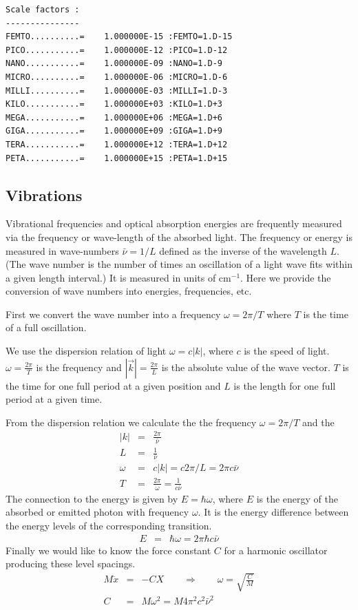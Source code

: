 \documentclass[final,12pt,makeidx,DIV=calc]{article}
\begin{document}
{{{\begin{verbatim}
Scale factors :
---------------
FEMTO..........=    1.000000E-15 :FEMTO=1.D-15
PICO...........=    1.000000E-12 :PICO=1.D-12
NANO...........=    1.000000E-09 :NANO=1.D-9
MICRO..........=    1.000000E-06 :MICRO=1.D-6
MILLI..........=    1.000000E-03 :MILLI=1.D-3
KILO...........=    1.000000E+03 :KILO=1.D+3
MEGA...........=    1.000000E+06 :MEGA=1.D+6
GIGA...........=    1.000000E+09 :GIGA=1.D+9
TERA...........=    1.000000E+12 :TERA=1.D+12
PETA...........=    1.000000E+15 :PETA=1.D+15
\end{verbatim}

\newpage
\subsection{Vibrations}

Vibrational frequencies and optical absorption energies are frequently
measured via the frequency or wave-length of the absorbed light. The
frequency or energy is measured in wave-numbers $\bar{\nu}=1/L$
defined as the inverse of the wavelength $L$. (The wave number is the
number of times an oscillation of a light wave fits within a given
length interval.) It is measured in units of cm$^{-1}$. Here we
provide the conversion of wave numbers into energies, frequencies,
etc.


First we convert the wave number into a frequency $\omega=2\pi/T$ where $T$ is
the time of a full oscillation. 

We use the dispersion relation of light $\omega=c|k|$, where $c$ is the speed
of light. $\omega=\frac{2\pi}{T}$ is the frequency and
$|\vec{k}|=\frac{2\pi}{L}$ is the absolute value of the wave vector. $T$ is the
time for one full period at a given position and $L$ is the length for one
full period at a given time.

From the dispersion relation we calculate the 
the frequency $\omega=2\pi/T$ and the 
\begin{eqnarray}
|k|&=&\frac{2\pi}{\bar{\nu}}
\label{eq:kofbarnu}
\\
L&=&\frac{1}{\bar{\nu}}
\label{eq:wavelengthofbarnu}
\\
\omega&=&c|k|=c2\pi/L=2\pi c\bar{\nu}
\label{eq:omegaofbarnu}
\\
T&=&\frac{2\pi}{\omega}=\frac{1}{c\bar{\nu}}
\label{eq:periodofbarnu}
\end{eqnarray}
The connection to the energy is given by $E=\hbar\omega$, where $E$ is the
energy of the absorbed or emitted photon with frequency $\omega$. It is the
energy difference between the energy levels of the corresponding transition.
\begin{eqnarray}
E&=&\hbar\omega=2\pi\hbar c\bar{\nu}
\label{eq:eofomega}
\end{eqnarray}
Finally we would like to know the force constant $C$ for a harmonic oscillator
producing these level spacings. 
\begin{eqnarray}
M\ddot{x}&=&-CX
\qquad\Rightarrow\qquad \omega= \sqrt{\frac{C}{M}}
\nonumber\\
C&=&M\omega^2=M4\pi^2c^2\bar{\nu}^2
\end{eqnarray}

}}}
\end{document}
